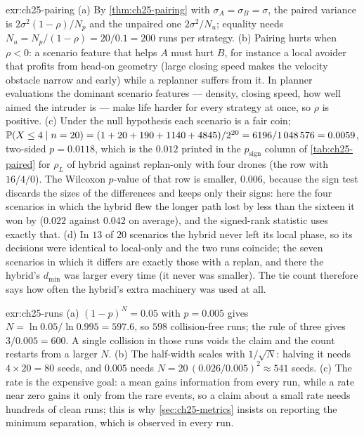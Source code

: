 \begin{solution}{exr:ch25-pairing}
(a) By \cref{thm:ch25-pairing} with $\sigma_A = \sigma_B = \sigma$, the paired variance is $2\sigma^2(1-\rho)/N_p$ and the unpaired one $2\sigma^2/N_u$; equality needs $N_u = N_p/(1-\rho) = 20/0.1 = 200$ runs per strategy. (b) Pairing hurts when $\rho < 0$: a scenario feature that helps $A$ must hurt $B$, for instance a local avoider that profits from head-on geometry (large closing speed makes the velocity obstacle narrow and early) while a replanner suffers from it. In planner evaluations the dominant scenario features --- density, closing speed, how well aimed the intruder is --- make life harder for every strategy at once, so $\rho$ is positive. (c) Under the null hypothesis each scenario is a fair coin; $\mathbb{P}(X \le 4 \mid n = 20) = (1 + 20 + 190 + 1140 + 4845)/2^{20} = 6196/1\,048\,576 = 0.0059$, two-sided $p = 0.0118$, which is the $0.012$ printed in the $p_{\mathrm{sign}}$ column of \cref{tab:ch25-paired} for $\rho_L$ of hybrid against replan-only with four drones (the row with $16 / 4 / 0$). The Wilcoxon $p$-value of that row is smaller, $0.006$, because the sign test discards the sizes of the differences and keeps only their signs: here the four scenarios in which the hybrid flew the longer path lost by less than the sixteen it won by ($0.022$ against $0.042$ on average), and the signed-rank statistic uses exactly that. (d) In $13$ of $20$ scenarios the hybrid never left its local phase, so its decisions were identical to local-only and the two runs coincide; the seven scenarios in which it differs are exactly those with a replan, and there the hybrid's $d_{\min}$ was larger every time (it never was smaller). The tie count therefore says how often the hybrid's extra machinery was used at all.
\end{solution}

\begin{solution}{exr:ch25-runs}
(a) $(1-p)^N = 0.05$ with $p = 0.005$ gives $N = \ln 0.05 / \ln 0.995 = 597.6$, so $598$ collision-free runs; the rule of three gives $3/0.005 = 600$. A single collision in those runs voids the claim and the count restarts from a larger $N$. (b) The half-width scales with $1/\sqrt{N}$: halving it needs $4 \times 20 = 80$ seeds, and $0.005$ needs $N = 20\,(0.026/0.005)^2 \approx 541$ seeds. (c) The rate is the expensive goal: a mean gains information from every run, while a rate near zero gains it only from the rare events, so a claim about a small rate needs hundreds of clean runs; this is why \cref{sec:ch25-metrics} insists on reporting the minimum separation, which is observed in every run.
\end{solution}

